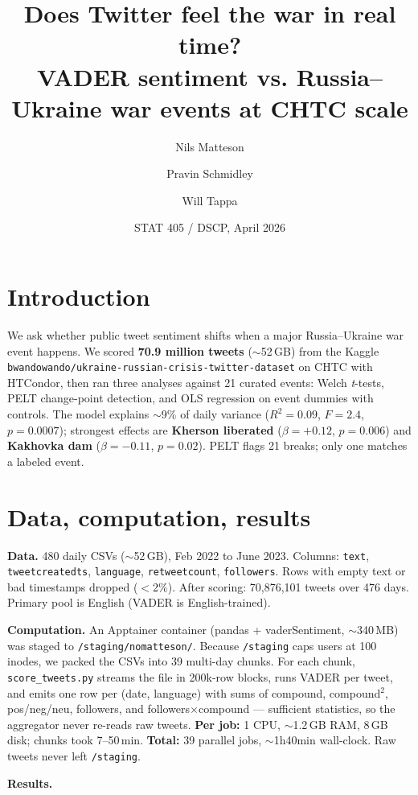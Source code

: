 \documentclass[11pt]{article}
\title{Does Twitter feel the war in real time?\\
       \large VADER sentiment vs. Russia--Ukraine war events at CHTC scale}
\author{Nils Matteson \and Pravin Schmidley \and Will Tappa}
\date{STAT 405 / DSCP, April 2026}
\begin{document}
\maketitle

\section*{Introduction}

We ask whether public tweet sentiment shifts when a major
Russia--Ukraine war event happens. We scored \textbf{70.9 million tweets}
($\sim$52\,GB) from the Kaggle
\texttt{bwandowando/\allowbreak ukraine-\allowbreak russian-\allowbreak crisis-\allowbreak twitter-\allowbreak dataset}
on CHTC
with HTCondor, then ran three analyses against 21 curated events:
Welch \textit{t}-tests, PELT change-point detection, and OLS
regression on event dummies with controls. The model explains
$\sim$9\% of daily variance ($R^2 = 0.09$, $F = 2.4$,
$p = 0.0007$); strongest effects are \textbf{Kherson liberated}
($\beta = +0.12$, $p = 0.006$) and \textbf{Kakhovka dam}
($\beta = -0.11$, $p = 0.02$). PELT flags 21 breaks; only one
matches a labeled event.

\section*{Data, computation, results}

\textbf{Data.} 480 daily CSVs ($\sim$52\,GB), Feb 2022 to June 2023.
Columns: \texttt{text}, \texttt{tweetcreatedts}, \texttt{language},
\texttt{retweetcount}, \texttt{followers}. Rows with empty text or
bad timestamps dropped ($<$2\%). After scoring: 70{,}876{,}101
tweets over 476 days. Primary pool is English (VADER is
English-trained).

\textbf{Computation.} An Apptainer container (pandas +
vaderSentiment, $\sim$340\,MB) was staged to
\texttt{/staging/nomatteson/}. Because \texttt{/staging} caps
users at 100 inodes, we packed the CSVs into 39 multi-day chunks.
For each chunk, \texttt{score\_tweets.py} streams the file in
200k-row blocks, runs VADER per tweet, and emits one row per
(date, language) with sums of compound, compound$^2$,
pos/neg/neu, followers, and followers$\times$compound --- sufficient
statistics, so the aggregator never re-reads raw tweets.
\textbf{Per job:} 1 CPU, $\sim$1.2\,GB RAM, 8\,GB disk; chunks
took 7--50\,min. \textbf{Total:} 39 parallel jobs, $\sim$1h40min
wall-clock. Raw tweets never left \texttt{/staging}.

\textbf{Results.}
\end{document}
